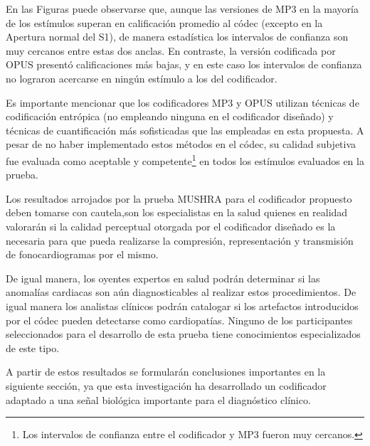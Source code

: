  En las Figuras puede observarse que, aunque las versiones de MP3 en la mayoría de los estímulos superan en calificación promedio al códec (excepto en la Apertura normal del S1), de manera estadística los intervalos de confianza son muy cercanos entre estas dos anclas. En contraste, la versión codificada por OPUS presentó calificaciones más bajas, y en este caso los intervalos de confianza no lograron acercarse en ningún estímulo a los del codificador.
 
 Es importante mencionar que los codificadores MP3 y OPUS utilizan técnicas de codificación entrópica (no empleando ninguna en el codificador diseñado) y técnicas de cuantificación más sofisticadas que las empleadas en esta propuesta. A pesar de no haber implementado estos métodos en el códec, su calidad subjetiva fue evaluada como aceptable y competente\footnote{Los intervalos de confianza entre el codificador y MP3 fueron muy cercanos.} en todos los estímulos evaluados en la prueba. 
 
 Los resultados arrojados por la prueba MUSHRA para el codificador propuesto deben tomarse con cautela,son los especialistas en la salud quienes en realidad valorarán si la calidad perceptual otorgada por el codificador diseñado es la necesaria para que pueda realizarse la compresión, representación y transmisión de fonocardiogramas por el mismo. 
 
 De igual manera, los oyentes expertos en salud podrán determinar si las anomalías cardiacas son aún diagnosticables al realizar estos procedimientos. De igual manera los analistas clínicos podrán catalogar si los artefactos introducidos por el códec pueden detectarse como cardiopatías. Ninguno de los participantes seleccionados para el desarrollo de esta prueba tiene conocimientos especializados de este tipo. 
 
 A partir de estos resultados se formularán conclusiones importantes en la siguiente sección, ya que esta investigación ha desarrollado un codificador adaptado a una señal biológica importante para el diagnóstico clínico. 
 
 



